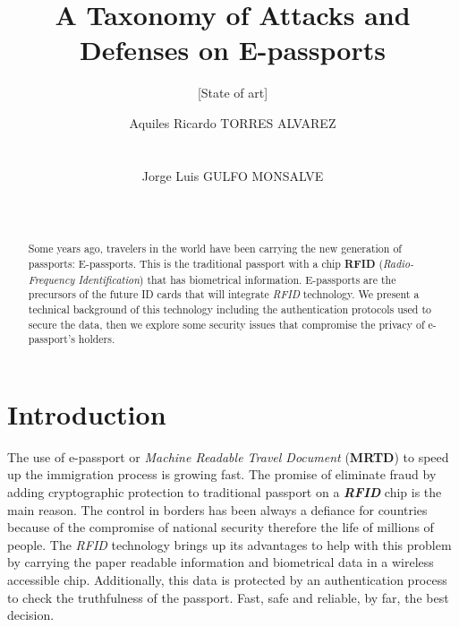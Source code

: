 \documentclass{acm_proc_article-sp}
\begin{document}
\title{A Taxonomy of Attacks and Defenses on E-passports}
\subtitle{[State of art]}

\author{
\alignauthor
Aquiles Ricardo TORRES ALVAREZ\\%
       \\
       \\
\alignauthor
Jorge Luis GULFO MONSALVE\\%
       \\
       \\
}

\maketitle
\begin{abstract}
Some years ago, travelers in the world have been carrying the new generation of passports: E-passports. This is the traditional passport with a chip \textbf{RFID} (\emph{Radio-Frequency Identification}) that has biometrical information. E-passports are the precursors of the future ID cards that will integrate \emph{RFID} technology. We present a technical background of this technology including the authentication protocols used to secure the data, then we explore some security issues that compromise the privacy of e-passport’s holders.  

\end{abstract}



\section{Introduction}
The use of e-passport or \emph{Machine Readable Travel Document} (\textbf{MRTD}) to speed up the immigration process is growing fast. The promise of eliminate fraud by adding cryptographic protection to traditional passport on a \emph{\textbf{RFID}} chip is the main reason.
The control in borders has been always a defiance for countries because of the compromise of national security therefore the life of millions of people. The \emph{RFID }technology brings up its advantages to help with this problem by carrying the paper readable information and biometrical data in a wireless accessible chip. Additionally, this data is protected by an authentication process to check the truthfulness of the passport. Fast, safe and reliable, by far, the best decision. 
\end{document}
